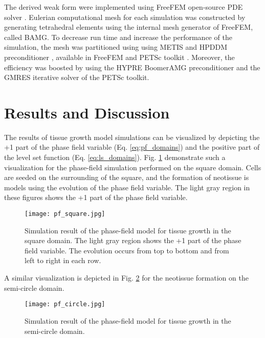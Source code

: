 The derived weak form were implemented using FreeFEM open-source PDE solver \cite{Hecht2012}. Eulerian computational mesh for each simulation was constructed by generating tetrahedral elements using the internal mesh generator of FreeFEM, called BAMG. To decrease run time and increase the performance of the simulation, the mesh was partitioned using using METIS \cite{METIS1998} and HPDDM preconditioner \cite{Jolivet2013}, available in FreeFEM and PETSc toolkit \cite{petsc}. Moreover, the efficiency was boosted by using the HYPRE BoomerAMG preconditioner \cite{Falgout2002} and the GMRES iterative solver \cite{Saad1986} of the PETSc toolkit.


\section{Results and Discussion}

The results of tissue growth model simulations can be visualized by depicting the +1 part of the phase field variable (Eq. \ref{eq:pf_domains}) and the positive part of the level set function (Eq. \ref{eq:ls_domains}). Fig. \ref{fig:tissue_pf_square} demonstrate such a visualization for the phase-field simulation performed on the square domain. Cells are seeded on the surrounding of the square, and the formation of neotissue is models using the evolution of the phase field variable. The light gray region in these figures shows the +1 part of the phase field variable. 

\begin{figure}
\medskip
\centering
\texttt{[image: pf\_square.jpg]}
\caption[Simulation result of the phase-field model for tissue growth in the square domain]{Simulation result of the phase-field model for tissue growth in the square domain. The light gray region shows the +1 part of the phase field variable. The evolution occurs from top to bottom and from left to right in each row.}
\label{fig:tissue_pf_square}
\end{figure}

A similar visualization is depicted in Fig. \ref{fig:tissue_pf_circle} for the neotissue formation on the semi-circle domain. 


\begin{figure}
\medskip
\centering
\texttt{[image: pf\_circle.jpg]}
\caption[Simulation result of the phase-field model for tissue growth in the semi-circle domain]{Simulation result of the phase-field model for tissue growth in the semi-circle domain.}
\label{fig:tissue_pf_circle}
\end{figure}

